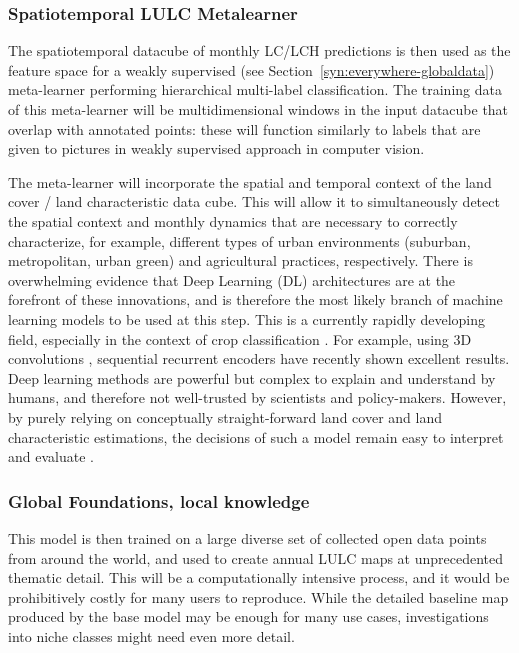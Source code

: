         \subsubsection{Spatiotemporal LULC Metalearner}
            The spatiotemporal datacube of monthly LC/LCH predictions is then used as the feature space for a weakly supervised (see Section\@~\ref{syn:everywhere-globaldata}) meta-learner performing hierarchical multi-label classification. The training data of this meta-learner will be multidimensional windows in the input datacube that overlap with annotated points: these will function similarly to labels that are given to pictures in weakly supervised approach in computer vision. 
            
            The meta-learner will incorporate the spatial and temporal context of the land cover / land characteristic data cube. This will allow it to simultaneously detect the spatial context and monthly dynamics that are necessary to correctly characterize, for example, different types of urban environments (suburban, metropolitan, urban green) and agricultural practices, respectively.
            There is overwhelming evidence \citep{barriere2023boosting, russwurm2018multi, xu20183d, brown2022dynamic,xu2021towards} that Deep Learning (DL) architectures are at the forefront of these innovations, and is therefore the most likely branch of machine learning models to be used at this step.
            This is a currently rapidly developing field, especially in the context of crop classification \citep{barriere2023boosting}.  For example, using 3D convolutions \citep{xu20183d}, sequential recurrent encoders \citep{russwurm2018multi} have recently shown excellent results. Deep learning methods are powerful but complex to explain and understand by humans, and therefore not well-trusted by scientists and policy-makers. However, by purely relying on conceptually straight-forward land cover and land characteristic estimations, the decisions of such a model remain easy to interpret and evaluate \citep{ferchichi2022forecasting}.
    
        \subsubsection{Global Foundations, local knowledge}

            This model is then trained on a large diverse set of collected open data points from around the world, and used to create annual LULC maps at unprecedented thematic detail. This will be a computationally intensive process, and it would be prohibitively costly for many users to reproduce. 
            While the detailed baseline map produced by the base model may be enough for many use cases, investigations into niche classes might need even more detail.
            
